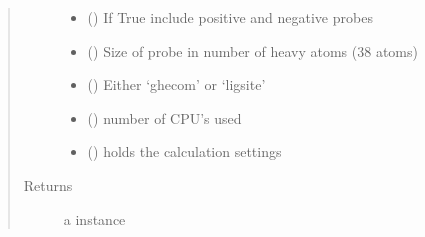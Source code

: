 \documentclass[letterpaper,10pt,english]{sphinxmanual}
\begin{document}
\begin{fulllineitems}
\begin{fulllineitems}
\begin{quote}
\begin{description}
\begin{itemize}
\item {} 
 () \textendash{} If True include positive and negative probes

\item {} 
 () \textendash{} Size of probe in number of heavy atoms (3\sphinxhyphen{}8 atoms)

\item {} 
 () \textendash{} Either ‘ghecom’ or ‘ligsite’

\item {} 
 () \textendash{} number of CPU’s used

\item {} 
 ({\hyperref[\detokenize{calculation_api:hotspots.calculation.Runner.Settings}]{}}) \textendash{} holds the calculation settings

\end{itemize}

\item[{Returns}] \leavevmode
a  instance

\end{description}\end{quote}

\begin{sphinxVerbatim}[commandchars=\\\{\}]
   
\end{sphinxVerbatim}

\begin{sphinxVerbatim}[commandchars=\\\{\}]
  
\end{sphinxVerbatim}


\end{fulllineitems}
\end{fulllineitems}
\end{document}
